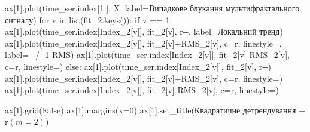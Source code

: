 \documentclass[
  letterpaper,
]{report}
\newenvironment{Shaded}{\begin{snugshade}}{\end{snugshade}}
\newcommand{\BuiltInTok}[1]{\textcolor[rgb]{0.00,0.23,0.31}{#1}}
\newcommand{\ControlFlowTok}[1]{\textcolor[rgb]{0.00,0.23,0.31}{#1}}
\newcommand{\DecValTok}[1]{\textcolor[rgb]{0.68,0.00,0.00}{#1}}
\newcommand{\KeywordTok}[1]{\textcolor[rgb]{0.00,0.23,0.31}{#1}}
\newcommand{\NormalTok}[1]{\textcolor[rgb]{0.00,0.23,0.31}{#1}}
\newcommand{\OperatorTok}[1]{\textcolor[rgb]{0.37,0.37,0.37}{#1}}
\newcommand{\StringTok}[1]{\textcolor[rgb]{0.13,0.47,0.30}{#1}}
\newcommand{\VariableTok}[1]{\textcolor[rgb]{0.07,0.07,0.07}{#1}}
\newcommand{\VerbatimStringTok}[1]{\textcolor[rgb]{0.13,0.47,0.30}{#1}}
\begin{document}
\begin{Shaded}
\begin{Highlighting}[]
\NormalTok{ax[}\DecValTok{1}\NormalTok{].plot(time\_ser.index[}\DecValTok{1}\NormalTok{:], X, label}\OperatorTok{=}\StringTok{\textquotesingle{}Випадкове блукання мультифрактального сигналу\textquotesingle{}}\NormalTok{)}
\ControlFlowTok{for}\NormalTok{ v }\KeywordTok{in} \BuiltInTok{list}\NormalTok{(fit\_2.keys()):}
    \ControlFlowTok{if}\NormalTok{ v }\OperatorTok{==} \DecValTok{1}\NormalTok{:}
\NormalTok{        ax[}\DecValTok{1}\NormalTok{].plot(time\_ser.index[Index\_2[v]], fit\_2[v], }\StringTok{\textquotesingle{}r{-}{-}\textquotesingle{}}\NormalTok{, label}\OperatorTok{=}\StringTok{\textquotesingle{}Локальний тренд\textquotesingle{}}\NormalTok{)}
\NormalTok{        ax[}\DecValTok{1}\NormalTok{].plot(time\_ser.index[Index\_2[v]], fit\_2[v]}\OperatorTok{+}\NormalTok{RMS\_2[v], c}\OperatorTok{=}\StringTok{\textquotesingle{}r\textquotesingle{}}\NormalTok{, linestyle}\OperatorTok{=}\StringTok{\textquotesingle{}{-}\textquotesingle{}}\NormalTok{, label}\OperatorTok{=}\StringTok{\textquotesingle{}+/{-} 1 RMS\textquotesingle{}}\NormalTok{)}
\NormalTok{        ax[}\DecValTok{1}\NormalTok{].plot(time\_ser.index[Index\_2[v]], fit\_2[v]}\OperatorTok{{-}}\NormalTok{RMS\_2[v], c}\OperatorTok{=}\StringTok{\textquotesingle{}r\textquotesingle{}}\NormalTok{, linestyle}\OperatorTok{=}\StringTok{\textquotesingle{}{-}\textquotesingle{}}\NormalTok{)}
    \ControlFlowTok{else}\NormalTok{:}
\NormalTok{        ax[}\DecValTok{1}\NormalTok{].plot(time\_ser.index[Index\_2[v]], fit\_2[v], }\StringTok{\textquotesingle{}r{-}{-}\textquotesingle{}}\NormalTok{)}
\NormalTok{        ax[}\DecValTok{1}\NormalTok{].plot(time\_ser.index[Index\_2[v]], fit\_2[v]}\OperatorTok{+}\NormalTok{RMS\_2[v], c}\OperatorTok{=}\StringTok{\textquotesingle{}r\textquotesingle{}}\NormalTok{, linestyle}\OperatorTok{=}\StringTok{\textquotesingle{}{-}\textquotesingle{}}\NormalTok{)}
\NormalTok{        ax[}\DecValTok{1}\NormalTok{].plot(time\_ser.index[Index\_2[v]], fit\_2[v]}\OperatorTok{{-}}\NormalTok{RMS\_2[v], c}\OperatorTok{=}\StringTok{\textquotesingle{}r\textquotesingle{}}\NormalTok{, linestyle}\OperatorTok{=}\StringTok{\textquotesingle{}{-}\textquotesingle{}}\NormalTok{)}

\NormalTok{ax[}\DecValTok{1}\NormalTok{].grid(}\VariableTok{False}\NormalTok{)}
\NormalTok{ax[}\DecValTok{1}\NormalTok{].margins(x}\OperatorTok{=}\DecValTok{0}\NormalTok{)}
\NormalTok{ax[}\DecValTok{1}\NormalTok{].set\_title(}\StringTok{\textquotesingle{}Квадратичне детрендування \textquotesingle{}} \OperatorTok{+} \VerbatimStringTok{r\textquotesingle{}$(m=2)$\textquotesingle{}}\NormalTok{)}




\end{Highlighting}
\end{Shaded}
\end{document}

